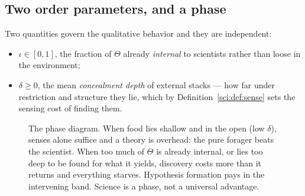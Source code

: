 \subsection{Two order parameters, and a phase}\label{sci:S13.2}

Two quantities govern the qualitative behavior and they are independent:
\begin{itemize}
\item $\iota \in [0,1]$, the fraction of $\Theta$ already \emph{internal} to scientists rather than
loose in the environment;
\item $\delta \ge 0$, the mean \emph{concealment depth} of external stacks --- how far under
restriction and structure they lie, which by Definition~\ref{sci:def:sense} sets the sensing cost of
finding them.
\end{itemize}

\begin{figure}[t]
\centering
{}
\caption{The phase diagram. When food lies shallow and in the open (low $\delta$), senses alone
suffice and a theory is overhead: the pure forager beats the scientist. When too much of $\Theta$ is
already internal, or lies too deep to be found for what it yields, discovery costs more than it
returns and everything starves. Hypothesis formation pays in the intervening band. Science is a phase,
not a universal advantage.}
\label{sci:fig:phase}
\end{figure}

